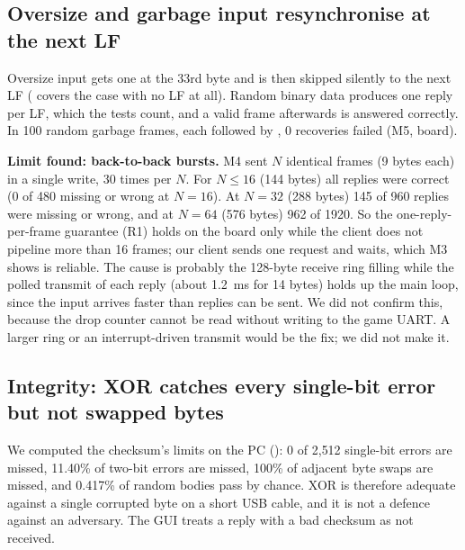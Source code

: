 \subsection{Oversize and garbage input resynchronise at the next LF}
Oversize input gets one  at the 33rd byte and is then skipped silently to the next LF
( covers the case with no LF at all). Random binary data produces one reply per LF, which the tests count, and a
valid frame afterwards is answered correctly. In 100 random garbage frames, each followed by , 0 recoveries failed (M5, board).

\textbf{Limit found: back-to-back bursts.} M4 sent $N$ identical  frames (9 bytes each) in a single write, 30 times per $N$. For $N\le16$ (144 bytes) all replies were correct (0 of 480 missing or wrong at $N=16$). At $N=32$ (288 bytes) 145 of 960 replies were missing or wrong, and at $N=64$ (576 bytes) 962 of 1920. So the one-reply-per-frame guarantee (R1) holds on the board only while the client does not pipeline more than 16 frames; our client sends one request and waits, which M3 shows is reliable. The cause is probably the 128-byte receive ring filling while the polled transmit of each reply (about 1.2~ms for 14 bytes) holds up the main loop, since the input arrives faster than replies can be sent. We did not confirm this, because the drop counter cannot be read without writing to the game UART. A larger ring or an interrupt-driven transmit would be the fix; we did not make it.

\subsection{Integrity: XOR catches every single-bit error but not swapped bytes}
We computed the checksum's limits on the PC (): 0 of 2{,}512 single-bit errors are missed, 11.40\% of two-bit errors are missed,
100\% of adjacent byte swaps are missed, and 0.417\% of random bodies pass by chance. XOR is therefore adequate against a single corrupted byte on a short USB cable, and it is not a defence
against an adversary. The GUI treats a reply with a bad checksum as not received.


